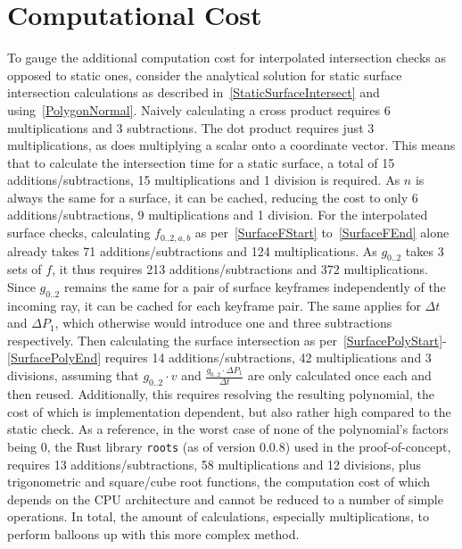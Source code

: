 \section{Computational Cost}\label{sec:IntersectionCost}

To gauge the additional computation cost for interpolated intersection checks as opposed to static ones,
consider the analytical solution for static surface intersection calculations as described in~\eqref{StaticSurfaceIntersect}
and using~\eqref{PolygonNormal}.
\newline
Naively calculating a cross product requires 6 multiplications and 3 subtractions.
The dot product requires just 3 multiplications, as does multiplying a scalar onto a coordinate vector.
This means that to calculate the intersection time for a static surface,
a total of 15 additions/subtractions, 15 multiplications and 1 division is required.
As \(n\) is always the same for a surface, it can be cached,
reducing the cost to only 6 additions/subtractions, 9 multiplications and 1 division.
\newline
For the interpolated surface checks, calculating \(f_{0..2, a, b}\) as per~\eqref{SurfaceFStart} to~\eqref{SurfaceFEnd}
alone already takes 71 additions/subtractions and 124 multiplications.
As \(g_{0..2}\) takes 3 sets of \(f\), it thus requires 213 additions/subtractions and 372 multiplications.
Since \(g_{0..2}\) remains the same for a pair of surface keyframes independently of the incoming ray,
it can be cached for each keyframe pair. The same applies for \(\Delta t\) and \(\Delta P_1\),
which otherwise would introduce one and three subtractions respectively.
\newline
Then calculating the surface intersection as per~\eqref{SurfacePolyStart}-\eqref{SurfacePolyEnd}
requires 14 additions/subtractions, 42 multiplications and 3 divisions,
assuming that \(g_{0..2} \cdot v\) and \(\frac{g_{0..2} \cdot \Delta P_1}{\Delta t}\)
are only calculated once each and then reused.
\newline
Additionally, this requires resolving the resulting polynomial,
the cost of which is implementation dependent, but also rather high compared to the static check.
As a reference, in the worst case of none of the polynomial's factors being 0,
the Rust library \verb|roots| (as of version 0.0.8) used in the proof-of-concept, requires 13 additions/subtractions,
58 multiplications and 12 divisions, plus trigonometric and square/cube root functions, the computation cost of which
depends on the CPU architecture and cannot be reduced to a number of simple operations.
\newline
In total, the amount of calculations, especially multiplications, to perform balloons up with this more complex method.

